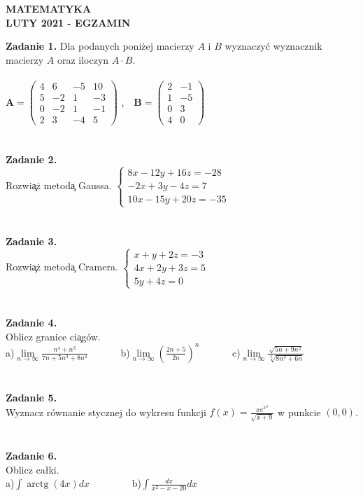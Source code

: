 \documentclass{report}
\begin{document}
\begin{center}
\textbf{MATEMATYKA \\LUTY 2021 - EGZAMIN}
\end{center}
\textbf{Zadanie 1.} 
Dla podanych poniżej macierzy $A$ i $B$ wyznaczyć wyznacznik macierzy $A$ oraz iloczyn $A\cdot B$.
\\\\
$
\mathbf{A} =
\left( \begin{array}{cccc}
4 & 6& -5 & 10\\
5 & -2& 1 & -3\\
0 & -2& 1 & -1\\
2 & 3 & -4 & 5 
\end{array} \right)
$ ,\ \ 
$
\mathbf{B} =
\left( \begin{array}{cccc}
2 & -1\\
1 & -5\\
0 & 3\\
4 & 0  
\end{array} \right)
$
\\\\\\\textbf{Zadanie 2.} 
\\Rozwi\c{a}\.z metod\c{a} Gaussa. 
$
\left\{ \begin{array}{ll}
8x-12y+16z=-28\\
-2x+3y-4z=7\\
10x-15y+20z=-35
\end{array} \right.
$
\\\\\\\textbf{Zadanie 3.} 
\\Rozwi\c{a}\.z metod\c{a} Cramera. 
$
\left\{ \begin{array}{ll}
x+y+2z=-3\\
4x+2y+3z=5\\
5y+4z=0
\end{array} \right.
$
\\\\\\\textbf{Zadanie 4.}
\\Oblicz granice ci\c{a}g\'ow.
\\a)$\lim\limits_{n\to\infty}\frac{n^4+n^3}{7n+5n^3+8n^4}$
\ \ \ \ \ \  b)$\lim\limits_{n\to \infty}(\frac{2n+5}{2n})^n$
\ \ \ \ \ \ c)$\lim\limits_{n\to\infty} \frac{\sqrt{5n+9n^2}}{\sqrt[3]{8n^3+6n}}$
\\\\\\\textbf{Zadanie 5.}
\\Wyznacz równanie stycznej do wykresu funkcji $f(x)=\frac{xe^{x^2}}{\sqrt{x+9}}$ w punkcie $(0,0)$. 
\\\\\\\textbf{Zadanie 6.}
\\Oblicz całki. 
\\a)$\int \operatorname{arctg}(4x) dx$ \ \ \ \ \ \ \ \ b)$\int \frac{dx}{x^2-x-20} dx$
\end{document}
